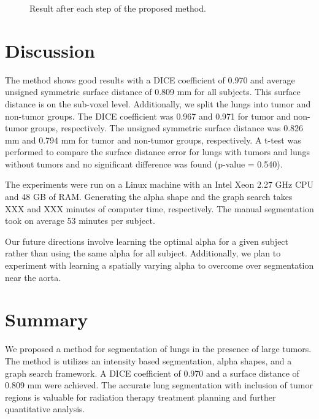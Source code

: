 \documentclass{llncs}
\begin{document}
\begin{figure}[t]
  \centering
  \caption{Result after each step of the proposed method.}
  \label{fig:steps}
\end{figure}
\fi





%
\section{Discussion}
%

The method shows good results with a DICE coefficient of 0.970 and average unsigned symmetric surface distance of 0.809 mm for all subjects. This surface distance is on the sub-voxel level. Additionally, we split the lungs into tumor and non-tumor groups. The DICE coefficient was 0.967 and 0.971 for tumor and non-tumor groups, respectively. The unsigned symmetric surface distance was 0.826 mm and 0.794 mm for tumor and non-tumor groups, respectively. A t-test was performed to compare the surface distance error for lungs with tumors and lungs without tumors and no significant difference was found (p-value = 0.540).

The experiments were run on a Linux machine with an Intel Xeon 2.27 GHz CPU and 48 GB of RAM. Generating the alpha shape and the graph search takes XXX and XXX minutes of computer time, respectively. The manual segmentation took on average 53 minutes per subject.

Our future directions involve learning the optimal alpha for a given subject rather than using the same alpha for all subject. Additionally, we plan to experiment with learning a spatially varying alpha to overcome over segmentation near the aorta.
%
\section{Summary}
%
We proposed a method for segmentation of lungs in the presence of large tumors. The method is utilizes an intensity based segmentation, alpha shapes, and a graph search framework. A DICE coefficient of 0.970 and a surface distance of 0.809 mm were achieved. The accurate lung segmentation with  inclusion of tumor regions is valuable for radiation therapy treatment planning and further quantitative analysis.
%
\end{document}
